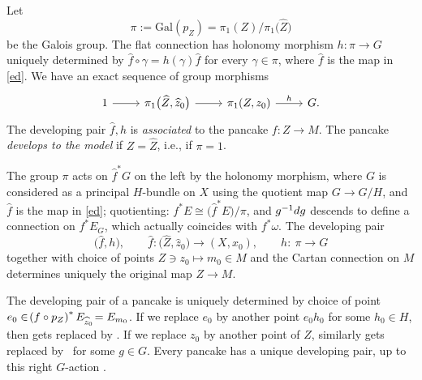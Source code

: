 \documentclass[11pt]{article}
\numberwithin{equation}{section}
\numberwithin{equation}{section}
\begin{document}
Let
\[
\pi := \text{Gal}(p_Z) = \pi_1(Z)/\pi_1\bigl(\widehat Z\bigr)
\]
be the Galois group. The flat connection has holonomy morphism
$
h \colon \pi \to G
$
uniquely determined by $\widehat{f}\circ\gamma = h(\gamma)\widehat{f}$ for every $\gamma \in \pi$, where $\widehat{f}$ is the map in \eqref{ed}.
We have an exact sequence of group morphisms
\[
\begin{tikzcd}
1\ar[r]& \pi_1\bigl(\widehat{Z}, \widehat{z}_0\bigr) \ar[r]&\fundamentalGroup{Z, z_0}\arrow{r}{h}&G.
\end{tikzcd}
\]
The developing pair $\widehat{f}, h$ is \emph{associated} to the pancake $f \colon Z \to M$.
The pancake \emph{develops to the model} if $Z = \widehat{Z}$, i.e., if $\pi = 1$.

The group $\pi$ acts on $\widehat{f}^* G$ on the left by the holonomy morphism,
where $G$ is considered as a principal $H$-bundle on $X$ using the quotient map
$G \longrightarrow G/H$, and $\widehat{f}$ is the map in \eqref{ed}; quotienting: $f^*E \cong \big(\widehat{f}^*E\big)/\pi$, and $g^{-1} {\rm d}g$ descends to define a connection on $f^*E_G$, which actually coincides with $f^*\omega$. The developing pair
\[
\big(\widehat{f}, h\big), \qquad
\widehat{f} \colon \big(\widehat{Z}, \widehat{z}_0\big) \to (X, x_0),\qquad
h \colon\ \pi \to G
\]
together with choice of points $Z \ni z_0 \longmapsto m_0 \in M$ and the Cartan connection on $M$ determines uniquely
the original map $Z \to M$.

The developing pair of a pancake is uniquely determined by choice of point $e_0 \in \! \left(f \circ p_Z\right) ^* E_{\widehat{z}_0}
 \!= E_{m_0}$. If we replace $e_0$ by another point $e_0 h_0$ for some $h_0 \in H$, then
 gets replaced by .
If we replace $z_0$ by another point of $Z$, similarly  gets replaced by~ for some $g \in G$.
Every pancake has a unique developing pair, up to this right $G$-action \cite[Section~2.3]{Biswas.McKay:2016}.
\end{document}
